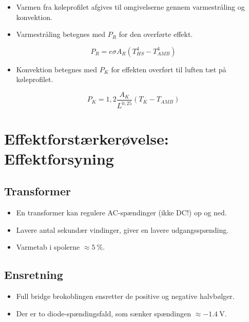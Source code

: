 \documentclass[danish]{article}
\begin{document}
\begin{itemize}
	\item Varmen fra køleprofilet afgives til omgivelserne gennem varmestråling og konvektion.
	\item Varmestråling betegnes med $P_R$ for den overførte effekt.
\end{itemize}

\begin{equation}
P_R = e \sigma A_R (T_{HS}^4-T_{AMB}^4)
\end{equation}

\begin{itemize}
	\item Konvektion betegnes med $P_K$ for effekten overført til luften tæt på køleprofilet.
\end{itemize}

\begin{equation}
P_K = 1,2 \frac{A_K}{L^{0,25}} (T_K-T_{AMB})
\end{equation}



\newpage
\section{Effektforstærkerøvelse: Effektforsyning}

\subsection{Transformer}
\begin{itemize}
	\item En transformer kan regulere AC-spændinger (ikke DC!) op og ned.
	\item Lavere antal sekundær vindinger, giver en lavere udgangsspænding.
	\item Varmetab i spolerne $\approx \SI{5}{\percent}$.
\end{itemize}


\subsection{Ensretning}
\begin{itemize}
	\item Full bridge brokoblingen ensretter de positive og negative halvbølger.
	\item Der er to diode-spændingsfald, som sænker spændingen $\approx \SI{-1.4}{\volt}$.
\end{itemize}
\end{document}
